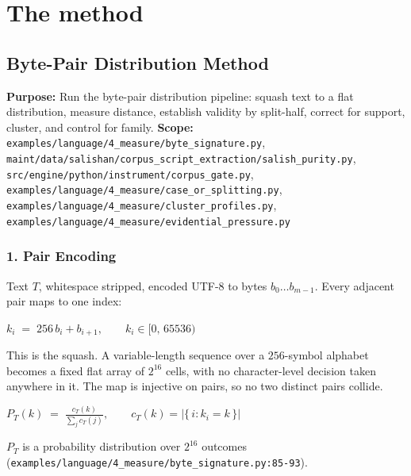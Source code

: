 \chapter{The method}

\section{Byte-Pair Distribution Method}

\textbf{Purpose:} Run the byte-pair distribution pipeline: squash text to a flat distribution, measure distance, establish validity by split-half, correct for support, cluster, and control for family. \textbf{Scope:} \texttt{examples/\allowbreak{}language/\allowbreak{}4\_\allowbreak{}measure/\allowbreak{}byte\_\allowbreak{}signature.\allowbreak{}py}, \texttt{maint/\allowbreak{}data/\allowbreak{}salishan/\allowbreak{}corpus\_\allowbreak{}script\_\allowbreak{}extraction/\allowbreak{}salish\_\allowbreak{}purity.\allowbreak{}py}, \texttt{src/\allowbreak{}engine/\allowbreak{}python/\allowbreak{}instrument/\allowbreak{}corpus\_\allowbreak{}gate.\allowbreak{}py}, \texttt{examples/\allowbreak{}language/\allowbreak{}4\_\allowbreak{}measure/\allowbreak{}case\_\allowbreak{}or\_\allowbreak{}splitting.\allowbreak{}py}, \texttt{examples/\allowbreak{}language/\allowbreak{}4\_\allowbreak{}measure/\allowbreak{}cluster\_\allowbreak{}profiles.\allowbreak{}py}, \texttt{examples/\allowbreak{}language/\allowbreak{}4\_\allowbreak{}measure/\allowbreak{}evidential\_\allowbreak{}pressure.\allowbreak{}py}

\subsection{1. Pair Encoding}

Text \(T\), whitespace stripped, encoded UTF-8 to bytes \(b_0 \dots b_{m-1}\). Every adjacent pair maps to one index:

\(k_i \;=\; 256\,b_i + b_{i+1}, \qquad k_i \in [0,\,65536)\)

This is the squash. A variable-length sequence over a \(256\)-symbol alphabet becomes a fixed flat array of \(2^{16}\) cells, with no character-level decision taken anywhere in it. The map is injective on pairs, so no two distinct pairs collide.

\(P_T(k) \;=\; \frac{c_T(k)}{\sum_{j} c_T(j)}, \qquad c_T(k) = \bigl|\{\, i : k_i = k \,\}\bigr|\)

\(P_T\) is a probability distribution over \(2^{16}\) outcomes (\texttt{examples/\allowbreak{}language/\allowbreak{}4\_\allowbreak{}measure/\allowbreak{}byte\_\allowbreak{}signature.\allowbreak{}py:85-\allowbreak{}93}).

